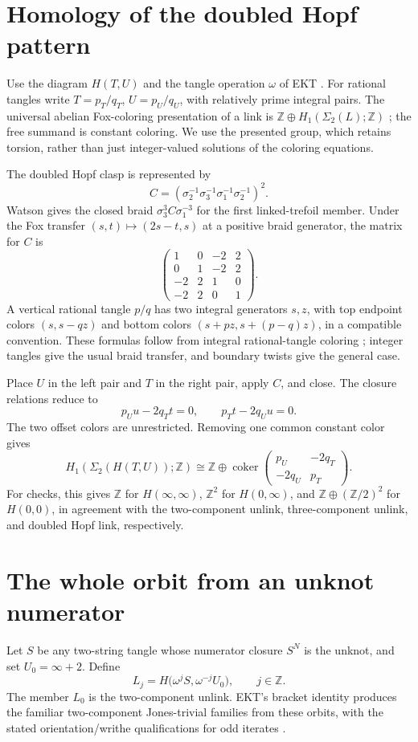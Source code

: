 \documentclass[11pt]{article}
\newcommand{\Z}{\mathbb Z}
\newcommand{\Sig}{\Sigma_2}
\begin{document}
\section{Homology of the doubled Hopf pattern}
Use the diagram $H(T,U)$ and the tangle operation $\omega$ of EKT \cite{EKT}. For rational tangles write $T=p_T/q_T$, $U=p_U/q_U$, with relatively prime integral pairs. The universal abelian Fox-coloring presentation of a link is $\Z\oplus H_1(\Sig(L);\Z)$ \cite[Theorem 3.3]{Przytycki}; the free summand is constant coloring. We use the presented group, which retains torsion, rather than just integer-valued solutions of the coloring equations.

The doubled Hopf clasp is represented by
\[
C=(\sigma_2^{-1}\sigma_3^{-1}\sigma_1^{-1}\sigma_2^{-1})^2.
\]
Watson \cite[Section 8.5, p.~157]{Watson} gives the closed braid $\sigma_3^3C\sigma_1^{-3}$ for the first linked-trefoil member. Under the Fox transfer $(s,t)\mapsto(2s-t,s)$ at a positive braid generator, the matrix for $C$ is
\[
\begin{pmatrix}
1&0&-2&2\\0&1&-2&2\\-2&2&1&0\\-2&2&0&1
\end{pmatrix}.
\]
A vertical rational tangle $p/q$ has two integral generators $s,z$, with top endpoint colors $(s,s-qz)$ and bottom colors $(s+pz,s+(p-q)z)$, in a compatible convention. These formulas follow from integral rational-tangle coloring \cite{KL}; integer tangles give the usual braid transfer, and boundary twists give the general case.

Place $U$ in the left pair and $T$ in the right pair, apply $C$, and close. The closure relations reduce to
\[
p_Uu-2q_Tt=0,\qquad p_Tt-2q_Uu=0.
\]
The two offset colors are unrestricted. Removing one common constant color gives
\begin{equation}\label{matrix}
H_1(\Sig(H(T,U));\Z)\cong\Z\oplus\operatorname{coker}
\begin{pmatrix}p_U&-2q_T\\-2q_U&p_T\end{pmatrix}.
\end{equation}
For checks, this gives $\Z$ for $H(\infty,\infty)$, $\Z^2$ for $H(0,\infty)$, and $\Z\oplus(\Z/2)^2$ for $H(0,0)$, in agreement with the two-component unlink, three-component unlink, and doubled Hopf link, respectively.

\section{The whole orbit from an unknot numerator}
Let $S$ be any two-string tangle whose numerator closure $S^N$ is the unknot, and set $U_0=\infty+2$. Define
\[
L_j=H\bigl(\omega^j S,\omega^{-j}U_0\bigr),\qquad j\in\Z.
\]
The member $L_0$ is the two-component unlink. EKT's bracket identity produces the familiar two-component Jones-trivial families from these orbits, with the stated orientation/writhe qualifications for odd iterates \cite{EKT}.
\end{document}
